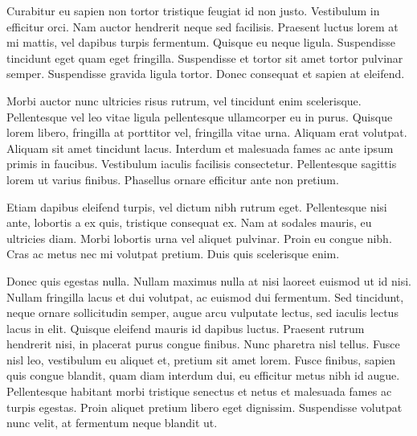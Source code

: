 Curabitur eu sapien non tortor tristique feugiat id non justo. Vestibulum in efficitur orci. Nam auctor hendrerit neque sed facilisis. Praesent luctus lorem at mi mattis, vel dapibus turpis fermentum. Quisque eu neque ligula. Suspendisse tincidunt eget quam eget fringilla. Suspendisse et tortor sit amet tortor pulvinar semper. Suspendisse gravida ligula tortor. Donec consequat et sapien at eleifend.

Morbi auctor nunc ultricies risus rutrum, vel tincidunt enim scelerisque. Pellentesque vel leo vitae ligula pellentesque ullamcorper eu in purus. Quisque lorem libero, fringilla at porttitor vel, fringilla vitae urna. Aliquam erat volutpat. Aliquam sit amet tincidunt lacus. Interdum et malesuada fames ac ante ipsum primis in faucibus. Vestibulum iaculis facilisis consectetur. Pellentesque sagittis lorem ut varius finibus. Phasellus ornare efficitur ante non pretium.

Etiam dapibus eleifend turpis, vel dictum nibh rutrum eget. Pellentesque nisi ante, lobortis a ex quis, tristique consequat ex. Nam at sodales mauris, eu ultricies diam. Morbi lobortis urna vel aliquet pulvinar. Proin eu congue nibh. Cras ac metus nec mi volutpat pretium. Duis quis scelerisque enim.

Donec quis egestas nulla. Nullam maximus nulla at nisi laoreet euismod ut id nisi. Nullam fringilla lacus et dui volutpat, ac euismod dui fermentum. Sed tincidunt, neque ornare sollicitudin semper, augue arcu vulputate lectus, sed iaculis lectus lacus in elit. Quisque eleifend mauris id dapibus luctus. Praesent rutrum hendrerit nisi, in placerat purus congue finibus. Nunc pharetra nisl tellus. Fusce nisl leo, vestibulum eu aliquet et, pretium sit amet lorem. Fusce finibus, sapien quis congue blandit, quam diam interdum dui, eu efficitur metus nibh id augue. Pellentesque habitant morbi tristique senectus et netus et malesuada fames ac turpis egestas. Proin aliquet pretium libero eget dignissim. Suspendisse volutpat nunc velit, at fermentum neque blandit ut.
